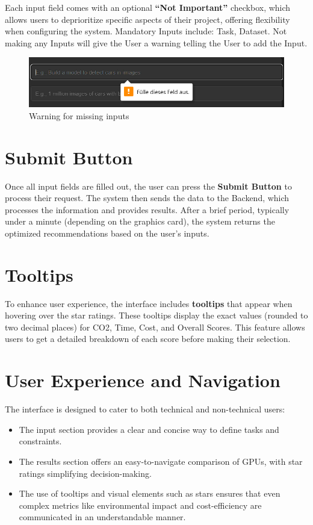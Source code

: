 \documentclass{report}
\begin{document}
Each input field comes with an optional \textbf{“Not Important”} checkbox, which allows users to deprioritize specific aspects of their project, offering flexibility when configuring the system. Mandatory Inputs include: Task, Dataset. Not making any Inputs will give the User a warning telling the User to add the Input.
\begin{figure}
    \centering
    \includegraphics[width=0.5\linewidth]{warning.png}
    \caption{Warning for missing inputs}
    \label{fig:enter-label}
\end{figure}

\section{Submit Button}
Once all input fields are filled out, the user can press the \textbf{Submit Button} to process their request. The system then sends the data to the Backend, which processes the information and provides results. After a brief period, typically under a minute (depending on the graphics card), the system returns the optimized recommendations based on the user’s inputs.

\section{Tooltips}
To enhance user experience, the interface includes \textbf{tooltips} that appear when hovering over the star ratings. These tooltips display the exact values (rounded to two decimal places) for CO2, Time, Cost, and Overall Scores. This feature allows users to get a detailed breakdown of each score before making their selection.

\section{User Experience and Navigation}
The interface is designed to cater to both technical and non-technical users:

\begin{itemize}
    \item The input section provides a clear and concise way to define tasks and constraints.
    \item The results section offers an easy-to-navigate comparison of GPUs, with star ratings simplifying decision-making.
    \item The use of tooltips and visual elements such as stars ensures that even complex metrics like environmental impact and cost-efficiency are communicated in an understandable manner.
\end{itemize}
\end{document}
